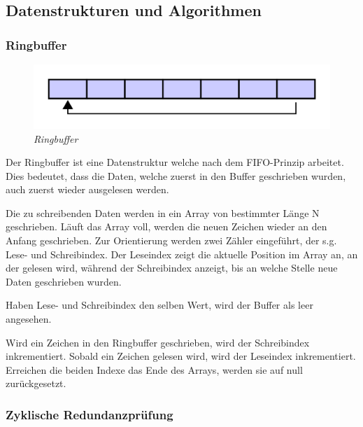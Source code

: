 \subsection{Datenstrukturen und Algorithmen}
\subsubsection{Ringbuffer}

\begin{figure}
     \vspace{-\baselineskip}
         \centering
         \includegraphics[scale=0.1]{Pictures/circular_buffer.png}
         \caption{\textit{Ringbuffer \citep{ImgBuffer}}}
         \label{img:Ringbuffer}
 \end{figure}

Der Ringbuffer ist eine Datenstruktur welche nach dem \acs{FIFO}-Prinzip arbeitet. Dies bedeutet, dass die Daten, welche
zuerst in den Buffer geschrieben wurden, auch zuerst wieder ausgelesen werden. 

\smallskip

Die zu schreibenden Daten werden in ein Array von bestimmter Länge N geschrieben. Läuft das Array voll, werden die neuen Zeichen
wieder an den Anfang geschrieben. Zur Orientierung werden zwei Zähler eingeführt, der s.g. Lese- und Schreibindex. Der Leseindex
zeigt die aktuelle Position im Array an, an der gelesen wird, während der Schreibindex anzeigt, bis an welche Stelle
neue Daten geschrieben wurden.  

Haben Lese- und Schreibindex den selben Wert, wird der Buffer als leer angesehen. 

\smallskip

Wird ein Zeichen in den Ringbuffer geschrieben, wird der Schreibindex inkrementiert. Sobald ein Zeichen gelesen wird, wird der Leseindex
inkrementiert. Erreichen die beiden Indexe das Ende des Arrays, werden sie auf null zurückgesetzt.


\subsubsection{Zyklische Redundanzprüfung}

